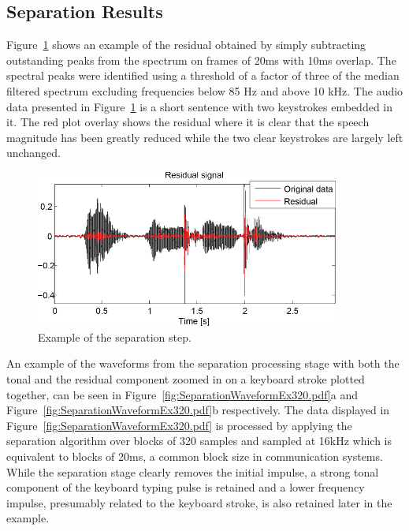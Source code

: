 \subsection{Separation Results} %
Figure~\ref{fig:Separation_Residual_Example} shows an example of the residual obtained by simply subtracting outstanding peaks from the spectrum on frames of 20ms with 10ms overlap. The spectral peaks were identified using a threshold of a factor of three of the median filtered spectrum excluding frequencies below 85 Hz and above 10 kHz. The audio data presented in Figure~\ref{fig:Separation_Residual_Example} is a short sentence with two keystrokes embedded in it. The red plot overlay shows the residual where it is clear that the speech magnitude has been greatly reduced while the two clear keystrokes are largely left unchanged. 

\begin{figure}
\begin{minipage}[b]{1.0\linewidth}
  \centering
  \centerline{\includegraphics[width=10cm]{Separation_Residual_Example}}
\end{minipage}
\caption{Example of the separation step.}
\label{fig:Separation_Residual_Example}
\end{figure}

An example of the waveforms from the separation processing stage with both the tonal and the residual component zoomed in on a keyboard stroke plotted together, can be seen in Figure~\ref{fig:SeparationWaveformEx320.pdf}a and Figure~\ref{fig:SeparationWaveformEx320.pdf}b respectively. The data displayed in Figure~\ref{fig:SeparationWaveformEx320.pdf} is processed by applying the separation algorithm over blocks of 320 samples and sampled at 16kHz which is equivalent to blocks of 20ms, a common block size in communication systems\cite{Subramanya2007}. While the separation stage clearly removes the initial impulse, a strong tonal component of the keyboard typing pulse is retained and a lower frequency impulse, presumably related to the keyboard stroke, is also retained later in the example.

